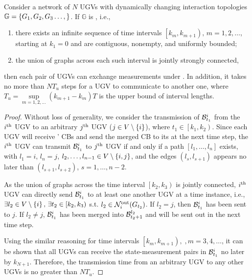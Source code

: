 	\begin{thm}\label{prop1}
		Consider a network of $N$ UGVs with dynamically changing interaction topologies \small$\mathbb{G}=\left\lbrace G_{1},G_{2},G_{3}\dots,\right\rbrace$\normalsize.
		If $\mathbb{G}$ is \fc, i.e.,
		\begin{enumerate}
			\item there exists an infinite sequence of time intervals $\left[k_m,k_{m+1} \right),\,m=1,2,\dots$, starting at $k_1=0$ and are contiguous, nonempty, and uniformly bounded;
			\item the union of graphs across each such interval is jointly strongly connected,
		\end{enumerate}
		then each pair of UGVs can exchange measurements under \proto. 
		In addition, it takes no more than $NT_u$ steps for a UGV to communicate to another one, 
		where \small$T_u=\sup\limits_{m=1,2,\dots}\left( k_{m+1}-k_m\right) T$ \normalsize is the upper bound of interval lengths.
	\end{thm}
	
	\begin{proof}				
		Without loss of generality, we consider the transmission of $\mathcal{B}^i_{t_1}$ from the $i^\text{th}$ UGV to an arbitrary $j^\text{th}$ UGV ($j\in V\setminus \left\lbrace i\right\rbrace$), where $t_1\in\left[k_1,k_2 \right)$.
		Since each UGV will receive \inbhd' CBs and send the merged CB to its {\onbhd} at the next time step, the $i^\text{th}$ UGV can transmit $\mathcal{B}^i_{t_1}$ to $j^\text{th}$ UGV if and only if a path $\left[l_1,\dots,l_n\right]$ exists, with $l_1=i$, $l_n=j$, $l_2,\dots,l_{n-1}\in V\setminus\left\lbrace i,j\right\rbrace$, and the edges $(l_s,l_{s+1})$ appears no later than $(l_{s+1},l_{s+2})$, $s=1,\dots,n-2$.
		
		As the union of graphs across the time interval $\left[k_2,k_3 \right)$ is jointly connected, $i^\text{th}$ UGV can directly send $\mathcal{B}^i_{t_1}$ to at least one another UGV at a time instance, i.e., $\exists l_2\in V\setminus \left\lbrace i\right\rbrace,\, \exists t_2\in \left[k_2,k_3 \right)$ s.t. $l_2\in\mathcal{N}^\text{out}_{i}(G_{t_2})$.
		If $l_2=j$, then $\mathcal{B}^i_{t_1}$ has been sent to $j$.
		If $l_2\neq j$, $\mathcal{B}^i_{t_1}$ has been merged into $\mathcal{B}^{l_2}_{t_2+1}$ and will be sent out in the next time step. 
		
		Using the similar reasoning for time intervals $\left[k_m,k_{m+1} \right),\;,m=3,4,\dots$, it can be shown that all UGVs can receive the state-measurement pairs in $\mathcal{B}^i_{t_1}$ no later by $k_{N+1}$.
		Therefore, the transmission time from an arbitrary UGV to any other UGVs is no greater than \small$NT_u$\normalsize.
		
	\end{proof}

